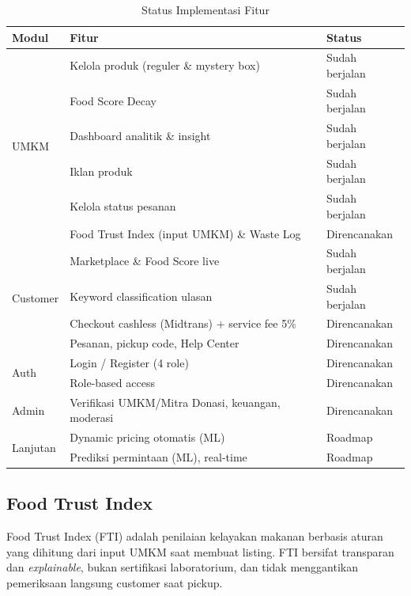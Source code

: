 \begin{table}[htbp]
\centering
\caption{Status Implementasi Fitur}
\label{tab:implementasi}
\small
\begin{tabularx}{\textwidth}{|l|X|l|}
\hline
\textbf{Modul} & \textbf{Fitur} & \textbf{Status} \\
\hline
\multirow{6}{*}{UMKM} & Kelola produk (reguler \& mystery box) & Sudah berjalan \\
\cline{2-3}
& Food Score Decay & Sudah berjalan \\
\cline{2-3}
& Dashboard analitik \& insight & Sudah berjalan \\
\cline{2-3}
& Iklan produk & Sudah berjalan \\
\cline{2-3}
& Kelola status pesanan & Sudah berjalan \\
\cline{2-3}
& Food Trust Index (input UMKM) \& Waste Log & Direncanakan \\
\hline
\multirow{4}{*}{Customer} & Marketplace \& Food Score live & Sudah berjalan \\
\cline{2-3}
& Keyword classification ulasan & Sudah berjalan \\
\cline{2-3}
& Checkout cashless (Midtrans) + service fee 5\% & Direncanakan \\
\cline{2-3}
& Pesanan, pickup code, Help Center & Direncanakan \\
\hline
\multirow{2}{*}{Auth} & Login / Register (4 role) & Direncanakan \\
\cline{2-3}
& Role-based access & Direncanakan \\
\hline
Admin & Verifikasi UMKM/Mitra Donasi, keuangan, moderasi & Direncanakan \\
\hline
\multirow{2}{*}{Lanjutan} & Dynamic pricing otomatis (ML) & Roadmap \\
\cline{2-3}
& Prediksi permintaan (ML), real-time & Roadmap \\
\hline
\end{tabularx}
\end{table}

\subsection{Food Trust Index}

Food Trust Index (FTI) adalah penilaian kelayakan makanan berbasis aturan yang dihitung dari input
UMKM saat membuat listing. FTI bersifat transparan dan \textit{explainable}, bukan sertifikasi
laboratorium, dan tidak menggantikan pemeriksaan langsung customer saat pickup.

